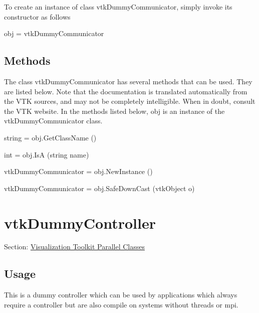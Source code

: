 To create an instance of class vtk\-Dummy\-Communicator, simply invoke its constructor as follows \begin{DoxyVerb}  obj = vtkDummyCommunicator
\end{DoxyVerb}
 \hypertarget{vtkwidgets_vtkxyplotwidget_Methods}{}\subsection{Methods}\label{vtkwidgets_vtkxyplotwidget_Methods}
The class vtk\-Dummy\-Communicator has several methods that can be used. They are listed below. Note that the documentation is translated automatically from the V\-T\-K sources, and may not be completely intelligible. When in doubt, consult the V\-T\-K website. In the methods listed below, {\ttfamily obj} is an instance of the vtk\-Dummy\-Communicator class. 
\begin{DoxyItemize}
\item {\ttfamily string = obj.\-Get\-Class\-Name ()}  
\item {\ttfamily int = obj.\-Is\-A (string name)}  
\item {\ttfamily vtk\-Dummy\-Communicator = obj.\-New\-Instance ()}  
\item {\ttfamily vtk\-Dummy\-Communicator = obj.\-Safe\-Down\-Cast (vtk\-Object o)}  
\end{DoxyItemize}\hypertarget{vtkparallel_vtkdummycontroller}{}\section{vtk\-Dummy\-Controller}\label{vtkparallel_vtkdummycontroller}
Section\-: \hyperlink{sec_vtkparallel}{Visualization Toolkit Parallel Classes} \hypertarget{vtkwidgets_vtkxyplotwidget_Usage}{}\subsection{Usage}\label{vtkwidgets_vtkxyplotwidget_Usage}
This is a dummy controller which can be used by applications which always require a controller but are also compile on systems without threads or mpi.

